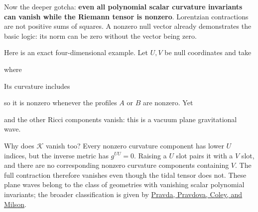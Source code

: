 \documentclass[
  11pt,
  letterpaper,
  oneside,
  openany]{scrbook}
\begin{document}
Now the deeper gotcha: \textbf{even all polynomial scalar curvature
invariants can vanish while the Riemann tensor is nonzero}. Lorentzian
contractions are not positive sums of squares. A nonzero null vector
already demonstrates the basic logic: its norm can be zero without the
vector being zero.

Here is an exact four-dimensional example. Let \(U,V\) be null
coordinates and take

\begin{center}
\begingroup
{}
\ifdim\wd\grmathbox>\linewidth
\resizebox{\linewidth}{!}{\usebox{\grmathbox}}
\else\usebox{\grmathbox}\fi
\endgroup
\end{center}

where

\begin{center}
\begingroup
{}
\ifdim\wd\grmathbox>\linewidth
\resizebox{\linewidth}{!}{\usebox{\grmathbox}}
\else\usebox{\grmathbox}\fi
\endgroup
\end{center}

Its curvature includes

\begin{center}
\begingroup
{}
\ifdim\wd\grmathbox>\linewidth
\resizebox{\linewidth}{!}{\usebox{\grmathbox}}
\else\usebox{\grmathbox}\fi
\endgroup
\end{center}

so it is nonzero whenever the profiles \(A\) or \(B\) are nonzero. Yet

\begin{center}
\begingroup
{}
\ifdim\wd\grmathbox>\linewidth
\resizebox{\linewidth}{!}{\usebox{\grmathbox}}
\else\usebox{\grmathbox}\fi
\endgroup
\end{center}

and the other Ricci components vanish: this is a vacuum plane
gravitational wave.

Why does \(\mathcal K\) vanish too? Every nonzero curvature component
has lower \(U\) indices, but the inverse metric has \(g^{UU}=0\).
Raising a \(U\) slot pairs it with a \(V\) slot, and there are no
corresponding nonzero curvature components containing \(V\). The full
contraction therefore vanishes even though the tidal tensor does not.
These plane waves belong to the class of geometries with vanishing
scalar polynomial invariants; the broader classification is given by
\href{https://arxiv.org/abs/gr-qc/0209024}{Pravda, Pravdova, Coley, and
Milson}.
\end{document}
